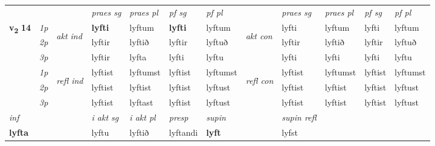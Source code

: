 \begin{longtable}[l]{X>{\footnotesize\itshape}llXXXXlXXXX}
 & &   & \textit{praes sg}  & \textit{praes pl}    & \textit{ pf sg} & \textit{pf pl} & & \textit{praes sg}  & \textit{praes pl}    & \textit{pf sg} & \textit{pf pl }  \\ \cmidrule{4-7} \cmidrule{9-12}
 \multirow{2}{*}{{{\textbf{v{\textsubscript{2}}} \Large{\textbf{14}}}}}  & 1p & \multirow{3}{*}{\begin{turn}{90}\textit{akt ind}\end{turn}} & \textbf{lyfti} & lyftum & \textbf{lyfti} & lyftum & \multirow{3}{*}{\begin{turn}{90}\textit{akt con}\end{turn}} &lyfti & lyftum & lyfti & lyftum\\*
 & 2p &  &  lyftir  & lyftið & lyftir & lyftuð & & lyftir & lyftið & lyftir & lyftuð \\*
 & 3p &  & lyftir & lyfta & lyfti & lyftu & & lyfti & lyfti& lyfti & lyftu \\*
\cmidrule{4-7} \cmidrule{9-12}
 & 1p & \multirow{3}{*}{\begin{turn}{90}\textit{refl ind}\end{turn}}  & lyftist & lyftumst & lyftist & lyftumst & \multirow{3}{*}{\begin{turn}{90}\textit{refl con}\end{turn}}  &lyftist & lyftumst & lyftist & lyftumst \\*
 & 2p &  & lyftist & lyftist & lyftist & lyftust & &lyftist & lyftist & lyftist & lyftust \\*
 & 3p  & & lyftist & lyftast & lyftist & lyftust & & lyftist & lyftist& lyftist & lyftust \\*
\cmidrule{4-7} \cmidrule{9-12}

   {\textit{inf}} & &  & \textit{i akt sg} & \textit{i akt pl}   & \textit{presp} & \textit{supin} && \textit{supin refl}  \\*
  {\textbf{lyfta}} & && lyftu  & lyftið   & lyftandi &  \textbf{lyft} && lyfst  \\*

\midrule


\end{longtable}

